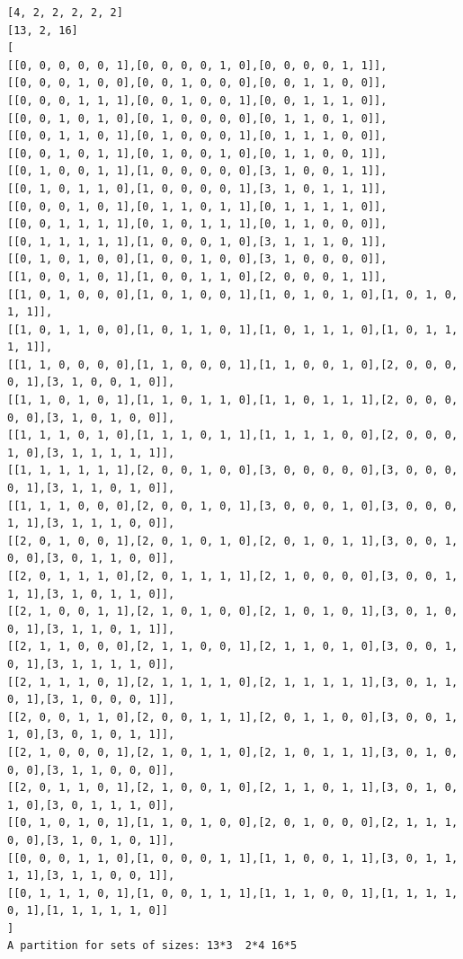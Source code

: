 \documentclass[final]{dmtcs-episciences}
\begin{document}
\begin{appendices}
\begin{verbatim} 
[4, 2, 2, 2, 2, 2]
[13, 2, 16]
[
[[0, 0, 0, 0, 0, 1],[0, 0, 0, 0, 1, 0],[0, 0, 0, 0, 1, 1]],
[[0, 0, 0, 1, 0, 0],[0, 0, 1, 0, 0, 0],[0, 0, 1, 1, 0, 0]],
[[0, 0, 0, 1, 1, 1],[0, 0, 1, 0, 0, 1],[0, 0, 1, 1, 1, 0]],
[[0, 0, 1, 0, 1, 0],[0, 1, 0, 0, 0, 0],[0, 1, 1, 0, 1, 0]],
[[0, 0, 1, 1, 0, 1],[0, 1, 0, 0, 0, 1],[0, 1, 1, 1, 0, 0]],
[[0, 0, 1, 0, 1, 1],[0, 1, 0, 0, 1, 0],[0, 1, 1, 0, 0, 1]],
[[0, 1, 0, 0, 1, 1],[1, 0, 0, 0, 0, 0],[3, 1, 0, 0, 1, 1]],
[[0, 1, 0, 1, 1, 0],[1, 0, 0, 0, 0, 1],[3, 1, 0, 1, 1, 1]],
[[0, 0, 0, 1, 0, 1],[0, 1, 1, 0, 1, 1],[0, 1, 1, 1, 1, 0]],
[[0, 0, 1, 1, 1, 1],[0, 1, 0, 1, 1, 1],[0, 1, 1, 0, 0, 0]],
[[0, 1, 1, 1, 1, 1],[1, 0, 0, 0, 1, 0],[3, 1, 1, 1, 0, 1]],
[[0, 1, 0, 1, 0, 0],[1, 0, 0, 1, 0, 0],[3, 1, 0, 0, 0, 0]],
[[1, 0, 0, 1, 0, 1],[1, 0, 0, 1, 1, 0],[2, 0, 0, 0, 1, 1]],
[[1, 0, 1, 0, 0, 0],[1, 0, 1, 0, 0, 1],[1, 0, 1, 0, 1, 0],[1, 0, 1, 0, 1, 1]],
[[1, 0, 1, 1, 0, 0],[1, 0, 1, 1, 0, 1],[1, 0, 1, 1, 1, 0],[1, 0, 1, 1, 1, 1]],
[[1, 1, 0, 0, 0, 0],[1, 1, 0, 0, 0, 1],[1, 1, 0, 0, 1, 0],[2, 0, 0, 0, 0, 1],[3, 1, 0, 0, 1, 0]],
[[1, 1, 0, 1, 0, 1],[1, 1, 0, 1, 1, 0],[1, 1, 0, 1, 1, 1],[2, 0, 0, 0, 0, 0],[3, 1, 0, 1, 0, 0]],
[[1, 1, 1, 0, 1, 0],[1, 1, 1, 0, 1, 1],[1, 1, 1, 1, 0, 0],[2, 0, 0, 0, 1, 0],[3, 1, 1, 1, 1, 1]],
[[1, 1, 1, 1, 1, 1],[2, 0, 0, 1, 0, 0],[3, 0, 0, 0, 0, 0],[3, 0, 0, 0, 0, 1],[3, 1, 1, 0, 1, 0]],
[[1, 1, 1, 0, 0, 0],[2, 0, 0, 1, 0, 1],[3, 0, 0, 0, 1, 0],[3, 0, 0, 0, 1, 1],[3, 1, 1, 1, 0, 0]],
[[2, 0, 1, 0, 0, 1],[2, 0, 1, 0, 1, 0],[2, 0, 1, 0, 1, 1],[3, 0, 0, 1, 0, 0],[3, 0, 1, 1, 0, 0]],
[[2, 0, 1, 1, 1, 0],[2, 0, 1, 1, 1, 1],[2, 1, 0, 0, 0, 0],[3, 0, 0, 1, 1, 1],[3, 1, 0, 1, 1, 0]],
[[2, 1, 0, 0, 1, 1],[2, 1, 0, 1, 0, 0],[2, 1, 0, 1, 0, 1],[3, 0, 1, 0, 0, 1],[3, 1, 1, 0, 1, 1]],
[[2, 1, 1, 0, 0, 0],[2, 1, 1, 0, 0, 1],[2, 1, 1, 0, 1, 0],[3, 0, 0, 1, 0, 1],[3, 1, 1, 1, 1, 0]],
[[2, 1, 1, 1, 0, 1],[2, 1, 1, 1, 1, 0],[2, 1, 1, 1, 1, 1],[3, 0, 1, 1, 0, 1],[3, 1, 0, 0, 0, 1]],
[[2, 0, 0, 1, 1, 0],[2, 0, 0, 1, 1, 1],[2, 0, 1, 1, 0, 0],[3, 0, 0, 1, 1, 0],[3, 0, 1, 0, 1, 1]],
[[2, 1, 0, 0, 0, 1],[2, 1, 0, 1, 1, 0],[2, 1, 0, 1, 1, 1],[3, 0, 1, 0, 0, 0],[3, 1, 1, 0, 0, 0]],
[[2, 0, 1, 1, 0, 1],[2, 1, 0, 0, 1, 0],[2, 1, 1, 0, 1, 1],[3, 0, 1, 0, 1, 0],[3, 0, 1, 1, 1, 0]],
[[0, 1, 0, 1, 0, 1],[1, 1, 0, 1, 0, 0],[2, 0, 1, 0, 0, 0],[2, 1, 1, 1, 0, 0],[3, 1, 0, 1, 0, 1]],
[[0, 0, 0, 1, 1, 0],[1, 0, 0, 0, 1, 1],[1, 1, 0, 0, 1, 1],[3, 0, 1, 1, 1, 1],[3, 1, 1, 0, 0, 1]],
[[0, 1, 1, 1, 0, 1],[1, 0, 0, 1, 1, 1],[1, 1, 1, 0, 0, 1],[1, 1, 1, 1, 0, 1],[1, 1, 1, 1, 1, 0]]
]
A partition for sets of sizes: 13*3  2*4 16*5
\end{verbatim}
\newpage


\end{appendices}
\end{document}
